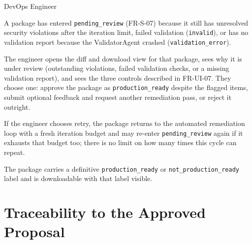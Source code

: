 \begin{description}[leftmargin=3.5cm, style=nextline]
  \item[Actor] DevOps Engineer
  \item[Precondition] A package has entered \texttt{pending\_review}
    (FR-S-07) because it still has unresolved security violations after
    the iteration limit, failed validation (\texttt{invalid}), or has no
    validation report because the ValidatorAgent crashed
    (\texttt{validation\_error}).
  \item[Main Flow] The engineer opens the diff and download view for that
    package, sees why it is under review (outstanding violations, failed
    validation checks, or a missing validation report), and sees the three
    controls described in FR-UI-07. They choose
    one: approve the package as \texttt{production\_ready} despite the
    flagged items, submit optional feedback and request another
    remediation pass, or reject it outright.
  \item[Alternate Flow] If the engineer chooses retry, the package returns
    to the automated remediation loop with a fresh iteration budget and
    may re-enter \texttt{pending\_review} again if it exhausts that budget
    too; there is no limit on how many times this cycle can repeat.
  \item[Postcondition] The package carries a definitive
    \texttt{production\_ready} or \texttt{not\_production\_ready} label
    and is downloadable with that label visible.
\end{description}

\section{Traceability to the Approved Proposal}
\label{sec:traceability}

